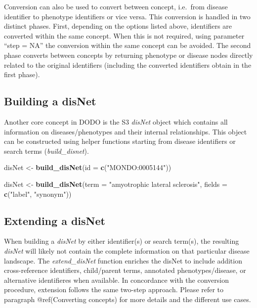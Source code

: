 \documentclass[9pt,a4paper,]{extarticle}
\newenvironment{Shaded}{\begin{snugshade}}{\end{snugshade}}
\newcommand{\DataTypeTok}[1]{\textcolor[rgb]{0.13,0.29,0.53}{#1}}
\newcommand{\KeywordTok}[1]{\textcolor[rgb]{0.13,0.29,0.53}{\textbf{#1}}}
\newcommand{\NormalTok}[1]{#1}
\newcommand{\StringTok}[1]{\textcolor[rgb]{0.31,0.60,0.02}{#1}}
\begin{document}
Conversion can also be used to convert between concept, i.e.~from disease identifier to phenotype identifiers or vice versa. This conversion is handled in two distinct phases. First, depending on the options listed above, identifiers are converted within the same concept. When this is not required, using parameter ``step = NA'' the conversion within the same concept can be avoided. The second phase converts between concepts by returning phenotype or disease nodes directly related to the original identifiers (including the converted identifiers obtain in the first phase).

\hypertarget{building-a-disnet}{%
\subsection{Building a disNet}\label{building-a-disnet}}

Another core concept in DODO is the S3 \emph{disNet} object which contains all information on diseases/phenotypes and their internal relationships. This object can be constructed using helper functions starting from disease identifiers or search terms (\emph{build\_disnet}).

\begin{Shaded}
\begin{Highlighting}[]
\NormalTok{disNet <-}\StringTok{ }\KeywordTok{build_disNet}\NormalTok{(}\DataTypeTok{id =} \KeywordTok{c}\NormalTok{(}\StringTok{"MONDO:0005144"}\NormalTok{))}

\NormalTok{disNet <-}\StringTok{ }\KeywordTok{build_disNet}\NormalTok{(}\DataTypeTok{term =} \StringTok{"amyotrophic lateral sclerosis"}\NormalTok{, }
                       \DataTypeTok{fields =} \KeywordTok{c}\NormalTok{(}\StringTok{"label"}\NormalTok{, }\StringTok{"synonym"}\NormalTok{))}
\end{Highlighting}
\end{Shaded}

\hypertarget{extending-a-disnet}{%
\subsection{Extending a disNet}\label{extending-a-disnet}}

When building a \emph{disNet} by either identifier(s) or search term(s), the resulting \emph{disNet} will likely not contain the complete information on that particular disease landscape. The \emph{extend\_disNet} function enriches the disNet to include addition cross-reference identifiers, child/parent terms, annotated phenotypes/disease, or alternative identifieres when available. In concordance with the conversion procedure, extension follows the same two-step approach. Please refer to paragraph @ref(Converting concepts) for more details and the different use cases.
\end{document}
